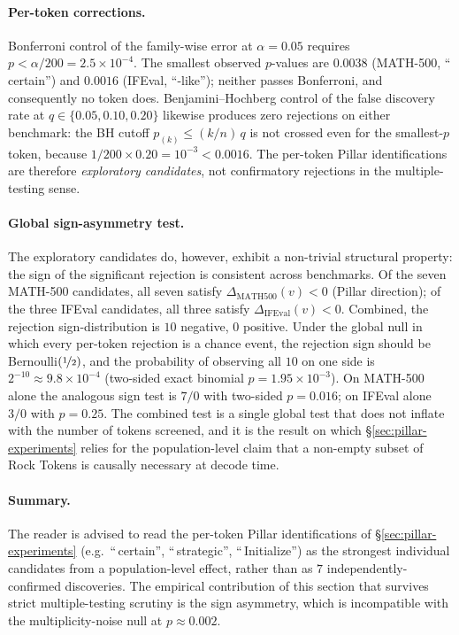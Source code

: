 \paragraph{Per-token corrections.} Bonferroni control of the family-wise error at $\alpha=0.05$ requires $p<\alpha/200=2.5\times 10^{-4}$. The smallest observed $p$-values are $0.0038$ (MATH-500, ``\,certain'') and $0.0016$ (IFEval, ``-like''); neither passes Bonferroni, and consequently no token does. Benjamini--Hochberg control of the false discovery rate at $q\in\{0.05, 0.10, 0.20\}$ likewise produces zero rejections on either benchmark: the BH cutoff $p_{(k)}\le (k/n)\,q$ is not crossed even for the smallest-$p$ token, because $1/200 \times 0.20 = 10^{-3} < 0.0016$. The per-token Pillar identifications are therefore \emph{exploratory candidates}, not confirmatory rejections in the multiple-testing sense.



\paragraph{Global sign-asymmetry test.} The exploratory candidates do, however, exhibit a non-trivial structural property: the sign of the significant rejection is consistent across benchmarks. Of the seven MATH-500 candidates, all seven satisfy $\Delta_{\mathrm{MATH500}}(v)<0$ (Pillar direction); of the three IFEval candidates, all three satisfy $\Delta_{\mathrm{IFEval}}(v)<0$. Combined, the rejection sign-distribution is $10$ negative, $0$ positive. Under the global null in which every per-token rejection is a chance event, the rejection sign should be Bernoulli$(\nicefrac{1}{2})$, and the probability of observing all $10$ on one side is $2^{-10}\approx 9.8\times 10^{-4}$ (two-sided exact binomial $p = 1.95\times 10^{-3}$). On MATH-500 alone the analogous sign test is $7/0$ with two-sided $p=0.016$; on IFEval alone $3/0$ with $p=0.25$. The combined test is a single global test that does not inflate with the number of tokens screened, and it is the result on which \S\ref{sec:pillar-experiments} relies for the population-level claim that a non-empty subset of Rock Tokens is causally necessary at decode time.

\paragraph{Summary.} The reader is advised to read the per-token Pillar identifications of \S\ref{sec:pillar-experiments} (e.g.\ ``\,certain'', ``\,strategic'', ``\,Initialize'') as the strongest individual candidates from a population-level effect, rather than as $7$ independently-confirmed discoveries. The empirical contribution of this section that survives strict multiple-testing scrutiny is the sign asymmetry, which is incompatible with the multiplicity-noise null at $p\approx 0.002$.

